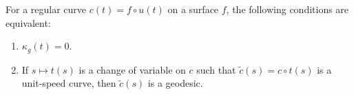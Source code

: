 For a regular curve $c(t) = f \circ u(t)$ on a surface $f$, the following conditions are equivalent:

\begin{enumerate}
\item[(i)] $\kappa_g(t) = 0$.

\item[(ii)] If $s \mapsto t(s)$ is a change of variable on $c$ such that $\tilde{c}(s) = c \circ t(s)$ is a unit-speed curve, then $\tilde{c}(s)$ is a geodesic.
\end{enumerate}
